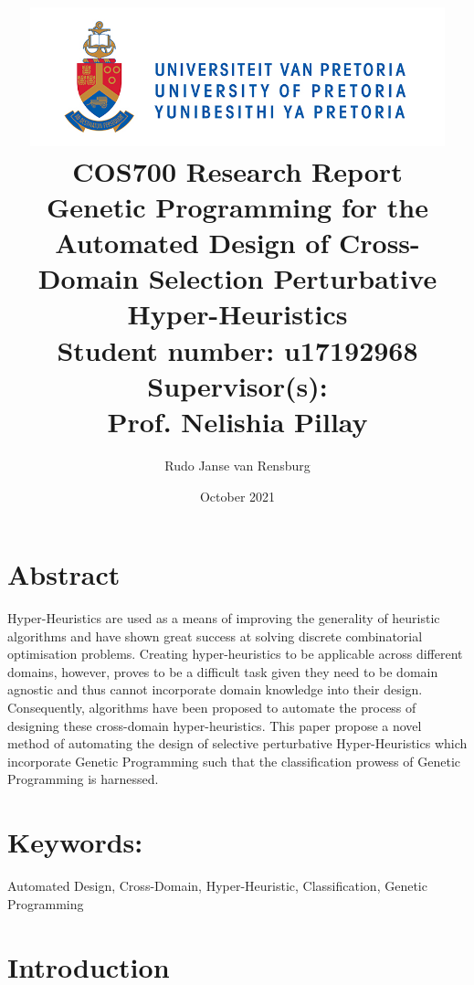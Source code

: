 \documentclass[a4paper,12pt]{article}
\title
{
   \includegraphics[width=12cm]{up-logo.jpg} \\
   \vspace{2cm}
   \textbf{COS700 Research Report} \\ \vspace{0.5cm}
   \textbf{Genetic Programming for the Automated Design of Cross-Domain Selection Perturbative Hyper-Heuristics } \\ \vspace{0.5cm}
   \textbf{Student number:} u17192968 \\ \vspace{0.5cm}
   \textbf{Supervisor(s)}: \\ Prof. Nelishia Pillay  
}
\author{Rudo Janse van Rensburg}
\date{October 2021}
\begin{document}
\maketitle

\newpage
\linespread{1.241}

\section*{Abstract}
    \par{
        \noindent 
        Hyper-Heuristics are used as a means of improving the generality of heuristic
        algorithms and have shown great success at solving discrete combinatorial 
        optimisation problems. Creating hyper-heuristics to be applicable across different
        domains, however, proves to be a difficult task given they need to be domain
        agnostic and thus cannot incorporate domain knowledge into their design. Consequently, 
        algorithms have been proposed to automate the process of designing
        these cross-domain hyper-heuristics. This paper propose a novel method of automating 
        the design of selective perturbative Hyper-Heuristics which incorporate Genetic Programming
        such that the classification prowess of Genetic Programming is harnessed.
    }

\section*{Keywords:}
    \par{Automated Design, Cross-Domain, Hyper-Heuristic, Classification, Genetic Programming}

\newpage
\section{Introduction}
\end{document}
